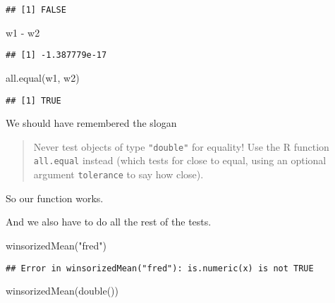 \documentclass[
]{article}
\newenvironment{Shaded}{\begin{snugshade}}{\end{snugshade}}
\newcommand{\FunctionTok}[1]{\textcolor[rgb]{0.00,0.00,0.00}{#1}}
\newcommand{\NormalTok}[1]{#1}
\newcommand{\SpecialCharTok}[1]{\textcolor[rgb]{0.00,0.00,0.00}{#1}}
\newcommand{\StringTok}[1]{\textcolor[rgb]{0.31,0.60,0.02}{#1}}
\begin{document}
\begin{verbatim}
## [1] FALSE
\end{verbatim}

\begin{Shaded}
\begin{Highlighting}[]
\NormalTok{w1 }\SpecialCharTok{{-}}\NormalTok{ w2}
\end{Highlighting}
\end{Shaded}

\begin{verbatim}
## [1] -1.387779e-17
\end{verbatim}

\begin{Shaded}
\begin{Highlighting}[]
\FunctionTok{all.equal}\NormalTok{(w1, w2)}
\end{Highlighting}
\end{Shaded}

\begin{verbatim}
## [1] TRUE
\end{verbatim}

We should have remembered the slogan

\begin{quote}
Never test objects of type \texttt{"double"} for equality! Use the R
function \texttt{all.equal} instead (which tests for close to equal,
using an optional argument \texttt{tolerance} to say how close).
\end{quote}

So our function works.

And we also have to do all the rest of the tests.

\begin{Shaded}
\begin{Highlighting}[]
\FunctionTok{winsorizedMean}\NormalTok{(}\StringTok{"fred"}\NormalTok{)}
\end{Highlighting}
\end{Shaded}

\begin{verbatim}
## Error in winsorizedMean("fred"): is.numeric(x) is not TRUE
\end{verbatim}

\begin{Shaded}
\begin{Highlighting}[]
\FunctionTok{winsorizedMean}\NormalTok{(}\FunctionTok{double}\NormalTok{())}
\end{Highlighting}
\end{Shaded}
\end{document}

